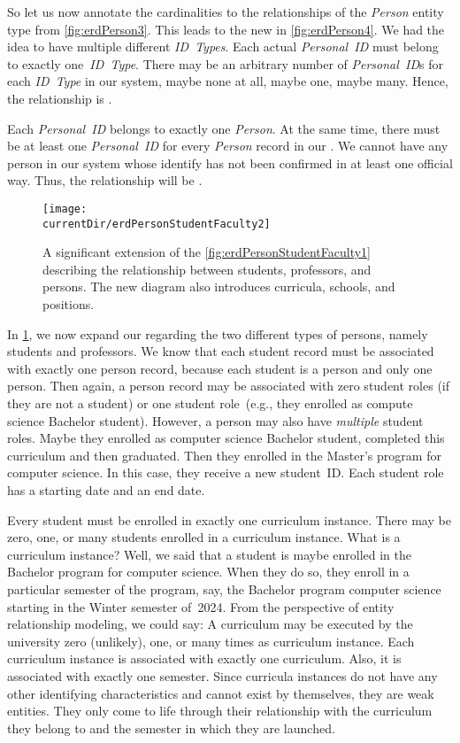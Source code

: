 So let us now annotate the cardinalities to the relationships of the \emph{Person} entity type from \cref{fig:erdPerson3}.
This leads to the new  in \cref{fig:erdPerson4}.
We had the idea to have multiple different \emph{ID~Types}.
Each actual \emph{Personal~ID} must belong to exactly one~\emph{ID~Type}.
There may be an arbitrary number of \emph{Personal~ID}s for each \emph{ID~Type} in our system, maybe none at all, maybe one, maybe many.
Hence, the relationship is .

Each \emph{Personal~ID} belongs to exactly one \emph{Person}.
At the same time, there must be at least one \emph{Personal~ID} for every \emph{Person} record in our \db.
We cannot have any person in our system whose identify has not been confirmed in at least one official way.
Thus, the relationship will be .

\begin{figure}%
\centering%
\texttt{[image: \\currentDir/erdPersonStudentFaculty2]}%
\caption{A significant extension of the \cref{fig:erdPersonStudentFaculty1}  describing the relationship between students, professors, and persons. %
The new diagram also introduces curricula, schools, and positions.}%
\label{fig:erdPersonStudentFaculty2}%
\end{figure}%

In \cref{fig:erdPersonStudentFaculty2}, we now expand our  regarding the two different types of persons, namely students and professors.
We know that each student record must be associated with exactly one person record, because each student is a person and only one person.
Then again, a person record may be associated with zero student roles (if they are not a student) or one student role~(e.g., they enrolled as compute science Bachelor student).
However, a person may also have \emph{multiple} student roles.
Maybe they enrolled as computer science Bachelor student, completed this curriculum and then graduated.
Then they enrolled in the Master's program for computer science.
In this case, they receive a new student~ID.
Each student role has a starting date and an end date.

Every student must be enrolled in exactly one curriculum instance.
There may be zero, one, or many students enrolled in a curriculum instance.
What is a curriculum instance?
Well, we said that a student is maybe enrolled in the Bachelor program for computer science.
When they do so, they enroll in a particular semester of the program, say, the Bachelor program computer science starting in the Winter semester of~2024.
From the perspective of entity relationship modeling, we could say:
A curriculum may be executed by the university zero (unlikely), one, or many times as curriculum instance.
Each curriculum instance is associated with exactly one curriculum.
Also, it is associated with exactly one semester.
Since curricula instances do not have any other identifying characteristics and cannot exist by themselves, they are weak entities.
They only come to life through their relationship with the curriculum they belong to and the semester in which they are launched.

